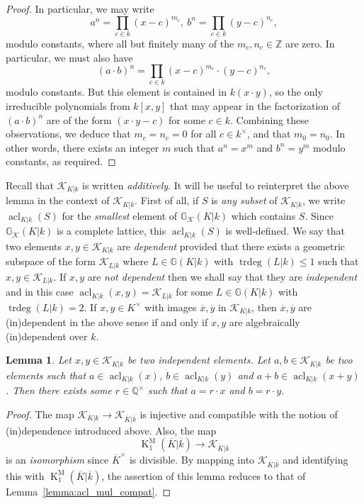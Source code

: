 \documentclass[12pt]{amsart}
\newcommand{\KM}{\operatorname{K}^\mathrm{M}}
\newcommand{\Zbb}{\mathbb{Z}}
\newcommand{\Qbb}{\mathbb{Q}}
\newcommand{\Gbb}{\mathbb{G}}
\newcommand{\trdeg}{\operatorname{trdeg}}
\newcommand{\acl}{\operatorname{acl}}
\newcommand{\Kcal}{\mathcal{K}}
\renewcommand{\bar}{\overline}
\newtheorem{lemma}[theorem]{Lemma}
\theoremstyle{definition}
\begin{document}
\begin{proof}
  In particular, we may write
  \[ a^{n} = \prod_{c \in k} (x-c)^{m_{c}}, \ b^{n} = \prod_{c \in k} (y-c)^{n_{c}}, \]
  modulo constants, where all but finitely many of the $m_{c}, n_{c} \in \Zbb$ are zero.
  In particular, we must also have
  \[ (a \cdot b)^{n} = \prod_{c \in k} (x-c)^{m_{c}} \cdot (y-c)^{n_{c}}, \]
  modulo constants.
  But this element is contained in $k(x \cdot y)$, so the only irreducible polynomials from $k[x,y]$ that may appear in the factorization of $(a \cdot b)^{n}$ are of the form $(x \cdot y - c)$ for some $c \in k$.
  Combining these observations, we deduce that $m_{c} = n_{c} = 0$ for all $c \in k^{\times}$, and that $m_{0} = n_{0}$.
  In other words, there exists an integer $m$ such that $a^{n} = x^{m}$ and $b^{n} = y^{m}$ modulo constants, as required.
\end{proof}

Recall that $\Kcal_{K|k}$ is written \emph{additively}.
It will be useful to reinterpret the above lemma in the context of $\Kcal_{K|k}$.
First of all, if $S$ is \emph{any subset} of $\Kcal_{K|k}$, we write $\acl_{K|k}(S)$ for the \emph{smallest} element of $\Gbb_{\Kcal}(K|k)$ which contains $S$.
Since $\Gbb_{\Kcal}(K|k)$ is a complete lattice, this $\acl_{K|k}(S)$ is well-defined.
We say that two elements $x,y \in \Kcal_{K|k}$ are \emph{dependent} provided that there exists a geometric subspace of the form $\Kcal_{L|k}$ where $L \in \Gbb(K|k)$ with $\trdeg(L|k) \le 1$ such that $x,y \in \Kcal_{L|k}$.
If $x,y$ are \emph{not dependent} then we shall say that they are \emph{independent} and in this case $\acl_{K|k}(x,y) = \Kcal_{L|k}$ for some $L \in \Gbb(K|k)$ with $\trdeg(L|k) = 2$.
If $x,y \in K^{\times}$ with images $\bar x, \bar y$ in $\Kcal_{K|k}$, then $\bar x,\bar y$ are (in)dependent in the above sense if and only if $x,y$ are algebraically (in)dependent over $k$.

\begin{lemma}\label{lemma:acl_mul_compat_Kcal}
  Let $x,y \in \Kcal_{K|k}$ be two independent elements.
  Let $a,b \in \Kcal_{K|k}$ be two elements such that $a \in \acl_{K|k}(x)$, $b \in \acl_{K|k}(y)$ and $a + b \in \acl_{K|k}(x+y)$.
  Then there exists some $r \in \Qbb^{\times}$ such that $a = r \cdot x$ and $b = r \cdot y$.
\end{lemma}
\begin{proof}
  The map $\Kcal_{K|k} \to \Kcal_{\bar K|\bar k}$ is injective and compatible with the notion of (in)dependence introduced above.
  Also, the map
  \[ \KM_{1}(\bar K|\bar k) \to \Kcal_{\bar K|\bar k} \]
  is an \emph{isomorphism} since $\bar K^{\times}$ is divisible.
  By mapping into $\Kcal_{\bar K|\bar k}$ and identifying this with $\KM_{1}(\bar K|\bar k)$, the assertion of this lemma reduces to that of Lemma~\ref{lemma:acl_mul_compat}.
\end{proof}
\end{document}
